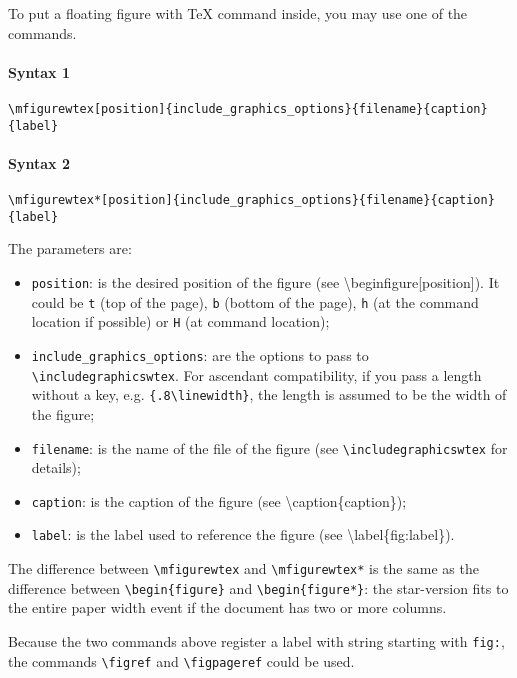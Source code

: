 \documentclass[book,taskpackage,specpackage,codepackage]{upmethodology-document}
\begin{document}
To put a floating figure with \TeX\xspace command inside, you may use one of the commands.

\paragraph{Syntax 1} \texttt{{\textbackslash}mfigurewtex[position]\{include\_graphics\_options\}\{filename\}\{caption\}\{label\}}

\paragraph{Syntax 2} \texttt{{\textbackslash}mfigurewtex*[position]\{include\_graphics\_options\}\{filename\}\{caption\}\{label\}}

The parameters are:
\begin{itemize}
\item \texttt{position}: is the desired position of the figure (see {\textbackslash}begin{figure}[position]). It could be \texttt{t} (top of the page), \texttt{b} (bottom of the page), \texttt{h} (at the command location if possible) or \texttt{H} (at command location);

\item \texttt{include\_graphics\_options}: are the options to pass to \texttt{{\textbackslash}includegraphicswtex}. For ascendant compatibility, if you pass a length without a key, e.g. \texttt{\{.8{\textbackslash}linewidth\}}, the length is assumed to be the width of the figure;

\item \texttt{filename}: is the name of the file of the figure (see \texttt{{\textbackslash}includegraphicswtex} for details);

\item \texttt{caption}: is the caption of the figure (see {\textbackslash}caption\{caption\});

\item \texttt{label}: is the label used to reference the figure (see {\textbackslash}label\{fig:label\}).
\end{itemize}

The difference between \texttt{{\textbackslash}mfigurewtex} and \texttt{{\textbackslash}mfigurewtex*} is the same as the difference between \texttt{{\textbackslash}begin\{figure\}} and \texttt{{\textbackslash}begin\{figure*\}}: the star-version fits to the entire paper width event if the document has two or more columns.

Because the two commands above register a label with string starting with \texttt{fig:}, the commands \texttt{{\textbackslash}figref} and \texttt{{\textbackslash}figpageref} could be used.
\end{document}
